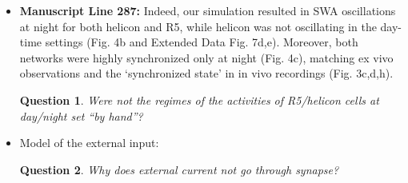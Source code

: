 \documentclass[11pt]{article}
\theoremstyle{questionstyle}
\newtheorem{question}{Question}
\theoremstyle{defaultstyle}
\begin{document}
\begin{itemize}
    \item \textbf{Manuscript Line 287:} Indeed, our simulation resulted in SWA oscillations at night for both helicon and R5, while helicon was not oscillating in the day-time settings (Fig. 4b and Extended Data Fig. 7d,e). Moreover, both networks were highly synchronized only at night (Fig. 4c), matching ex vivo observations and the ‘synchronized state’ in in vivo recordings (Fig. 3c,d,h).
    \begin{question}
        Were not the regimes of the activities of R5/helicon cells at day/night set “by hand”?
    \end{question}
    
    \item Model of the external input:
    \begin{question}
        Why does external current not go through synapse?
    \end{question}

\end{itemize}
\end{document}
